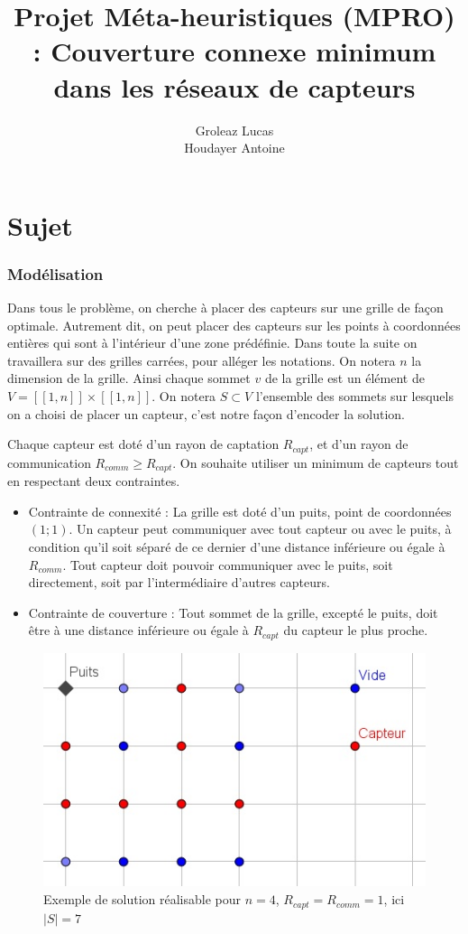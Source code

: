 \documentclass[12pt,a4paper]{article}
\title{Projet Méta-heuristiques (MPRO) : Couverture connexe minimum dans les réseaux de capteurs}
\author{Groleaz Lucas \\ Houdayer Antoine}
\begin{document}
\maketitle
\tableofcontents
\part{Sujet}
\section{Modélisation}
Dans tous le problème, on cherche à placer des capteurs sur une grille de façon optimale. Autrement dit, on peut placer des capteurs sur les points à coordonnées entières qui sont à l'intérieur d'une zone prédéfinie. Dans toute la suite on travaillera sur des grilles carrées, pour alléger les notations. On notera $n$ la dimension de la grille. Ainsi chaque sommet $v$ de la grille est un élément de $V=[\![1,n]\!]\times [\![1,n]\!]$. On notera $S\subset V$ l'ensemble des sommets sur lesquels on a choisi de placer un capteur, c'est notre façon d'encoder la solution.

Chaque capteur est doté d'un rayon de captation $R_{capt}$, et d'un rayon de communication $R_{comm}\geq R_{capt}$.  On souhaite utiliser un minimum de capteurs tout en respectant deux contraintes.
\begin{itemize}
\item Contrainte de connexité : La grille est doté d'un puits, point de coordonnées $(1;1)$. Un capteur peut communiquer avec tout capteur ou avec le puits, à condition qu'il soit séparé de ce dernier d'une distance inférieure ou égale à $R_{comm}$. Tout capteur doit pouvoir communiquer avec le puits, soit directement, soit par l'intermédiaire d'autres capteurs. 

\item Contrainte de couverture : Tout sommet de la grille, excepté le puits, doit être à une distance inférieure ou égale à $R_{capt}$ du capteur le plus proche.

\end{itemize}

\begin{figure}[h]
\begin{center}
\includegraphics[scale=1]{Images/4_1_1_realisable.jpg}
\caption{Exemple de solution réalisable pour $n=4$, $R_{capt}=R_{comm}=1$, ici $|S|=7$}
\end{center}
\end{figure}
\end{document}
